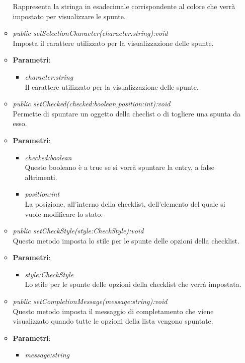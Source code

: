 \begin{itemize}
\begin{itemize}
{\begin{itemize}
		Rappresenta la stringa in esadecimale corrispondente al colore che verrà impostato per visualizzare le spunte.
		\end{itemize}} 
	\item \textit{public setSelectionCharacter(character:string):void}\\
	Imposta il carattere utilizzato per la visualizzazione delle spunte.
		\item{\textbf{Parametri}: \begin{itemize}
		\item \textit{character:string}\\
		Il carattere utilizzato per la visualizzazione delle spunte.
		\end{itemize}}
	\item \textit{public setChecked(checked:boolean,position:int):void}\\
	Permette di spuntare un oggetto della checlist o di togliere una spunta da esso.
		\item{\textbf{Parametri}: \begin{itemize}
		\item \textit{checked:boolean}\\
		Questo booleano è a true se si vorrà spuntare la entry, a false altrimenti.
		\item \textit{position:int}\\
		La posizione, all'interno della checklist, dell'elemento del quale si vuole modificare lo stato. 
		\end{itemize}} 
	\item \textit{public setCheckStyle(style:CheckStyle):void}\\
	Questo metodo imposta lo stile per le spunte delle opzioni della checklist.
		\item{\textbf{Parametri}: \begin{itemize}
		\item \textit{style:CheckStyle}\\
		Lo stile per le spunte delle opzioni della checklist che verrà impostata.
		\end{itemize}} 
	\item \textit{public setCompletionMessage(message:string):void}\\
	Questo metodo imposta il messaggio di completamento che viene visualizzato quando tutte le opzioni della lista vengono spuntate.
		\item{\textbf{Parametri}: \begin{itemize}
		\item \textit{message:string}\\

\end{itemize}}
\end{itemize}
\end{itemize}
